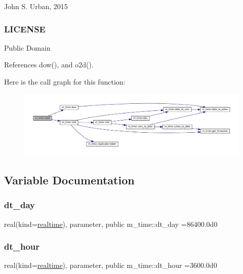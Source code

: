 John S. Urban, 2015 \subsubsection*{L\+I\+C\+E\+N\+SE}

Public Domain 

References dow(), and o2d().

Here is the call graph for this function\+:\nopagebreak
\begin{figure}[H]
\begin{center}
\leavevmode
\includegraphics[width=350pt]{namespacem__time_ac0ec48db8d508bfa23fe4b20c9d1c5a3_cgraph}
\end{center}
\end{figure}


\subsection{Variable Documentation}
\mbox{\label{namespacem__time_a97725f8d657c24badff19a794f323a6b}} 
\subsubsection{\texorpdfstring{dt\+\_\+day}{dt\_day}}
{\footnotesize\ttfamily real(kind=\mbox{\hyperlink{namespacem__time_ac10ea9e8d59ec74eaa7d89f2517d7422}{realtime}}), parameter, public m\+\_\+time\+::dt\+\_\+day =86400.\+0d0}

\mbox{\label{namespacem__time_aa0ca2172092f5e7dcc9b8524e6516fd8}} 
\subsubsection{\texorpdfstring{dt\+\_\+hour}{dt\_hour}}
{\footnotesize\ttfamily real(kind=\mbox{\hyperlink{namespacem__time_ac10ea9e8d59ec74eaa7d89f2517d7422}{realtime}}), parameter, public m\+\_\+time\+::dt\+\_\+hour =3600.\+0d0}

